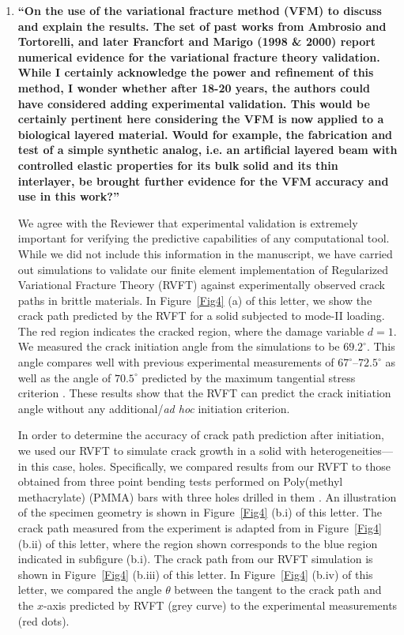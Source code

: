\documentclass[11pt,letterpaper]{report}
\begin{document}
\begin{enumerate}[label=\textit{2.\arabic*},wide, labelwidth=!, labelindent=0pt]
\item \label{r2c1} {\bf ``On the use of the variational fracture method (VFM) to discuss and explain the results. The set of past works from Ambrosio and Tortorelli, and later Francfort and Marigo (1998 \& 2000) report numerical evidence for the variational fracture theory validation. While I certainly acknowledge the power and refinement of this method, I wonder whether after 18-20 years, the authors could have considered adding experimental validation. This would be certainly pertinent here considering the VFM is now applied to a biological layered material. Would for example, the fabrication and test of a simple synthetic analog, i.e. an artificial layered beam with controlled elastic properties for its bulk solid and its thin interlayer, be brought further evidence for the VFM accuracy and use in this work?''}

We agree with the Reviewer that experimental validation is extremely important for verifying the predictive capabilities of any computational tool. While we did not include this information in the manuscript, we have carried out simulations to validate our finite element implementation of Regularized Variational Fracture Theory (RVFT) against experimentally observed crack paths in brittle materials. In Figure~\ref{Fig4} (a) of this letter, we show the crack path predicted by the RVFT for a solid subjected to mode-II loading. The red region indicates the cracked region, where the damage variable $d=1$. We measured the crack initiation angle from the simulations to be $69.2^\circ$. This angle compares well with previous experimental measurements of $67^\circ$--$72.5^\circ$ as well as the angle of $70.5^\circ$ predicted by the maximum tangential stress criterion \cite{erdogan1963crack}. These results show that the RVFT can predict the crack initiation angle without any additional/\emph{ad hoc} initiation criterion. 

In order to determine the accuracy of crack path prediction after initiation, we used our RVFT to simulate crack growth in a solid with heterogeneities---in this case, holes. Specifically, we compared results from our RVFT to those obtained from three point bending tests performed on Poly(methyl methacrylate) (PMMA) bars with three holes drilled in them \cite{bittencourt1996quasi}. An illustration of the specimen geometry is shown in Figure~\ref{Fig4} (b.i) of this letter. The crack path measured from the experiment is adapted from \cite{bittencourt1996quasi} in Figure~\ref{Fig4} (b.ii) of this letter, where the region shown corresponds to the blue region indicated in subfigure (b.i). The crack path from our RVFT simulation is shown in Figure~\ref{Fig4} (b.iii) of this letter. In Figure~\ref{Fig4} (b.iv) of this letter, we compared the angle $\theta$ between the tangent to the crack path and the $x$-axis predicted by RVFT (grey curve) to the experimental measurements (red dots).


\end{enumerate}
\end{document}
